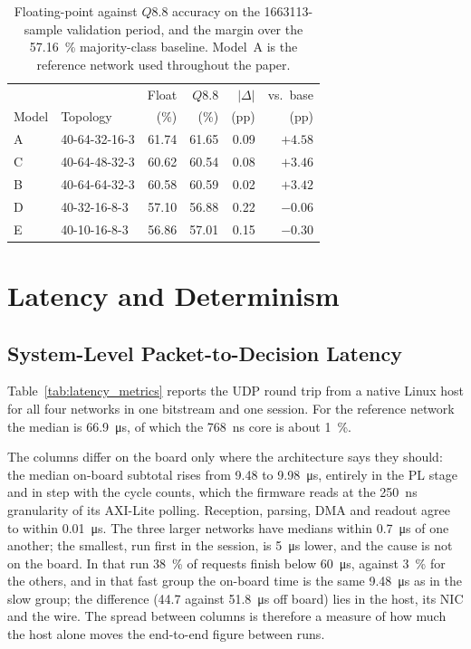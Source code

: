 \documentclass[final,5p,times,twocolumn]{elsarticle}
\begin{document}
\begin{table}[htbp]
\centering
\caption{Floating-point against $Q8.8$ accuracy on the
\num{1663113}-sample validation period, and the margin over the
\SI{57.16}{\percent} majority-class baseline. Model~A is the reference network
used throughout the paper.}
\label{tab:model_performance}
\small
\begin{tabular}{@{}llrrrr@{}}
\toprule
 & & Float & $Q8.8$ & $|\Delta|$ & vs.\ base \\
Model & Topology & (\%) & (\%) & (pp) & (pp) \\
\midrule
A & 40-64-32-16-3    & 61.74 & 61.65 & 0.09 & $+4.58$ \\
C & 40-64-48-32-3    & 60.62 & 60.54 & 0.08 & $+3.46$ \\
B & 40-64-64-32-3    & 60.58 & 60.59 & 0.02 & $+3.42$ \\
D & 40-32-16-8-3     & 57.10 & 56.88 & 0.22 & $-0.06$ \\
E & 40-10-16-8-3     & 56.86 & 57.01 & 0.15 & $-0.30$ \\
\bottomrule
\end{tabular}
\end{table}

\section{Latency and Determinism}
\label{sec:latency}
\subsection{System-Level Packet-to-Decision Latency}
Table~\ref{tab:latency_metrics} reports the UDP round trip from a native Linux
host for all four networks in one bitstream and one session. For the reference
network the median is \SI{66.9}{\micro\second}, of which the
\SI{768}{\nano\second} core is about \SI{1}{\percent}.

The columns differ on the board only where the architecture says they should:
the median on-board subtotal rises from \SI{9.48}{} to \SI{9.98}{\micro\second},
entirely in the PL stage and in step with the cycle counts, which the firmware
reads at the \SI{250}{\nano\second} granularity of its AXI-Lite polling.
Reception, parsing, DMA and readout agree to within \SI{0.01}{\micro\second}.
The three larger networks have medians within \SI{0.7}{\micro\second} of one
another; the smallest, run first in the session, is \SI{5}{\micro\second} lower,
and the cause is not on the board. In that run \SI{38}{\percent} of requests
finish below \SI{60}{\micro\second}, against \SI{3}{\percent} for the others,
and in that fast group the on-board time is the same \SI{9.48}{\micro\second}
as in the slow group; the difference (\SI{44.7}{} against
\SI{51.8}{\micro\second} off board) lies in the host, its NIC and the wire. The
spread between columns is therefore a measure of how much the host alone moves
the end-to-end figure between runs.
\end{document}

